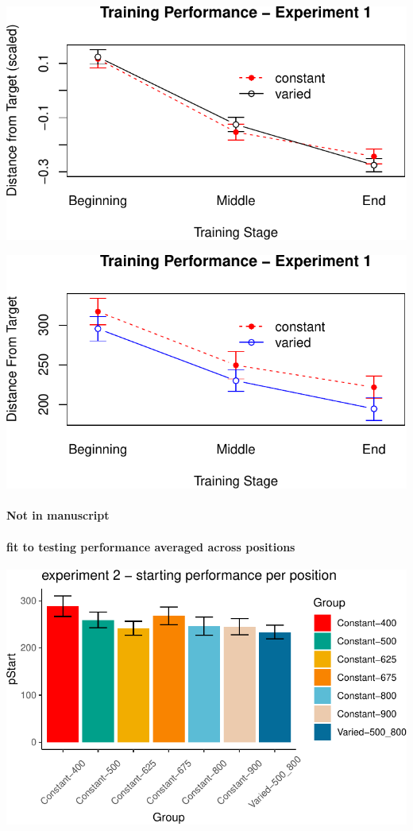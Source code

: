 \documentclass[
  12pt,
  letterpaper,
]{article}
\begin{document}
\includegraphics{full_files/figure-pdf/unnamed-chunk-68-2.pdf}

\includegraphics{full_files/figure-pdf/unnamed-chunk-68-3.pdf}

\paragraph{Not in manuscript}\label{not-in-manuscript}

\paragraph{fit to testing performance averaged across
positions}\label{fit-to-testing-performance-averaged-across-positions}

\includegraphics{full_files/figure-pdf/unnamed-chunk-69-1.pdf}
\end{document}
